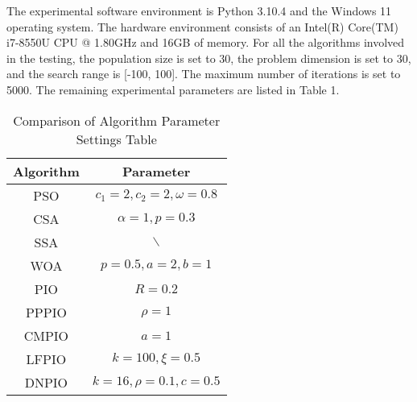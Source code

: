 \documentclass[preprint,review,compress,12pt]{elsarticle}
\begin{document}
The experimental software environment is Python 3.10.4 and the Windows 11 operating system. The hardware environment consists of an Intel(R) Core(TM) i7-8550U CPU @ 1.80GHz and 16GB of memory. For all the algorithms involved in the testing, the population size is set to 30, the problem dimension is set to 30, and the search range is [-100, 100]. The maximum number of iterations is set to 5000. The remaining experimental parameters are listed in Table 1.
\begin{table}[H]
\centering
\caption{Comparison of Algorithm Parameter Settings Table}
\begin{tabular}{cc}
\toprule
Algorithm  & Parameter \\
\midrule
PSO   &   $c_1=2,c_2=2,\omega = 0.8$ \\
CSA   &   $\alpha=1,p=0.3$\\
SSA   &    $\backslash$ \\
WOA   &    $p=0.5,a=2,b=1$\\
PIO   &    $R=0.2$\\
PPPIO &    $\rho = 1$\\
CMPIO &    $a=1$\\
LFPIO &   $k=100,\xi =0.5$\\
DNPIO &   $k=16,\rho =0.1,c=0.5$\\
\bottomrule
\end{tabular}
\end{table}
\end{document}
